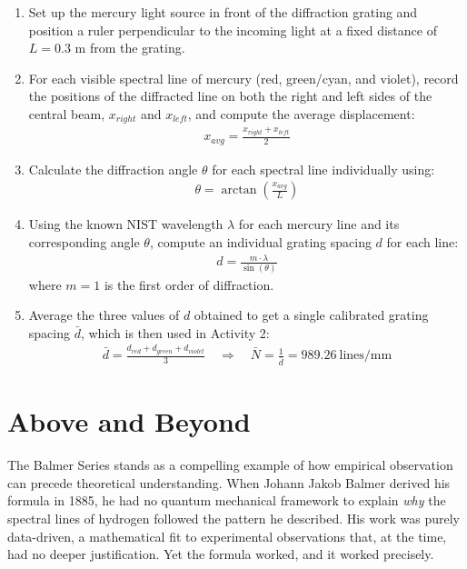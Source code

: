 \documentclass[12pt]{article}
\begin{document}
\begin{enumerate}
    \item Set up the mercury light source in front of the diffraction grating
    and position a ruler perpendicular to the incoming light at a fixed
    distance of $L = 0.3$ m from the grating.
    \item For each visible spectral line of mercury (red, green/cyan, and
    violet), record the positions of the diffracted line on both the right
    and left sides of the central beam, $x_{right}$ and $x_{left}$,
    and compute the average displacement:
    \begin{align*}
        x_{avg} = \frac{x_{right} + x_{left}}{2}
    \end{align*}
    \item Calculate the diffraction angle $\theta$ for each spectral line
    individually using:
    \begin{align*}
        \theta = \arctan\left(\frac{x_{avg}}{L}\right)
    \end{align*}
    \item Using the known NIST wavelength $\lambda$ for each mercury line and
    its corresponding angle $\theta$, compute an individual grating spacing
    $d$ for each line:
    \begin{align*}
        d = \frac{m \cdot \lambda}{\sin(\theta)}
    \end{align*}
    where $m = 1$ is the first order of diffraction.
    \item Average the three values of $d$ obtained to get a single calibrated
    grating spacing $\bar{d}$, which is then used in Activity 2:
    \begin{align*}
        \bar{d} = \frac{d_{red} + d_{green} + d_{violet}}{3}
        \quad \Longrightarrow \quad \bar{N} = \frac{1}{\bar{d}} = 989.26 \ \text{lines/mm}
    \end{align*}
\end{enumerate}

\section{Above and Beyond}
The Balmer Series stands as a compelling example of how empirical observation
can precede theoretical understanding. When Johann Jakob Balmer derived his
formula in 1885, he had no quantum mechanical framework to explain \textit{why}
the spectral lines of hydrogen followed the pattern he described. His work was
purely data-driven, a mathematical fit to experimental observations that,
at the time, had no deeper justification. Yet the formula worked, and it worked
precisely.
\end{document}
